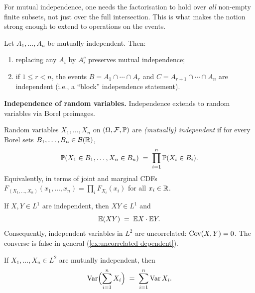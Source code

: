 For mutual independence, one needs the factorisation to hold over
\emph{all} non-empty finite subsets, not just over the full
intersection. This is what makes the notion strong enough to
extend to operations on the events.

\begin{proposition}
\label{prop:indep-stability}
Let $A_1, \dots, A_n$ be mutually independent. Then:
\begin{enumerate}[label=(\alph*)]
  \item replacing any $A_i$ by $A_i^c$ preserves mutual independence;
  \item if $1 \leq r < n$, the events $B = A_1 \cap \cdots \cap A_r$
        and $C = A_{r+1} \cap \cdots \cap A_n$ are independent (i.e.,
        a ``block'' independence statement).
\end{enumerate}
\end{proposition}

\medskip
\noindent\textbf{Independence of random variables.} Independence
extends to random variables via Borel preimages.

\begin{definition}
\label{def:indep-rv}
Random variables $X_1, \dots, X_n$ on $(\Omega, \mathcal{F}, \mathbb{P})$
are \emph{(mutually) independent} if for every Borel sets
$B_1, \dots, B_n \in \mathcal{B}(\mathbb{R})$,
\[
  \mathbb{P}(X_1 \in B_1, \dots, X_n \in B_n) \;=\; \prod_{i=1}^{n} \mathbb{P}(X_i \in B_i).
\]
Equivalently, in terms of joint and marginal CDFs
$F_{(X_1, \dots, X_n)}(x_1, \dots, x_n) = \prod_i F_{X_i}(x_i)$ for
all $x_i \in \mathbb{R}$.
\end{definition}

\begin{theorem}
\label{thm:indep-multiplicative}
If $X, Y \in L^1$ are independent, then $XY \in L^1$ and
\[
  \mathbb{E}(XY) \;=\; \mathbb{E} X \cdot \mathbb{E} Y.
\]
Consequently, independent variables in $L^2$ are uncorrelated:
$\operatorname{Cov}(X, Y) = 0$. The converse is false in general
(\cref{ex:uncorrelated-dependent}).
\end{theorem}

\begin{corollary}
\label{cor:var-sum-indep}
If $X_1, \dots, X_n \in L^2$ are mutually independent, then
\[
  \operatorname{Var}\Bigl(\sum_{i=1}^{n} X_i\Bigr) \;=\; \sum_{i=1}^{n} \operatorname{Var} X_i.
\]
\end{corollary}

